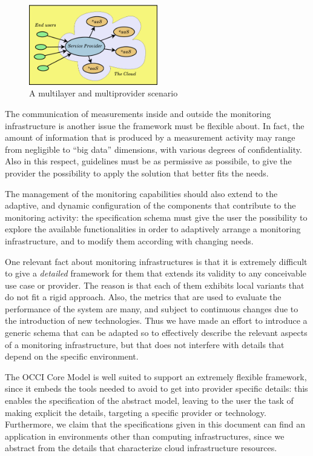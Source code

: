 \documentclass[10pt,a4paper]{article}
\begin{document}
\begin{figure}[b]
\centering
\includegraphics[width=0.5\textwidth]{figs/multilayer.pdf}
\caption{A multilayer and multiprovider scenario \label{img:scenario}}
\end{figure}

The communication of measurements inside and outside the monitoring infrastructure is another issue the framework must be flexible about. In fact, the amount of information that is produced by a measurement activity may range from negligible to ``big data'' dimensions, with various degrees of confidentiality. Also in this respect, guidelines must be as permissive as possibile, to give the provider the possibility to apply the solution that better fits the needs.

The management of the monitoring capabilities should also extend to the adaptive, and dynamic configuration of the components that contribute to the monitoring activity: the specification schema must give the user the possibility to explore the available functionalities in order to adaptively arrange a monitoring infrastructure, and to modify them according with changing needs.

One relevant fact about monitoring infrastructures is that it is extremely difficult to give a {\em detailed} framework for them that extends its validity to any conceivable use case or provider. The reason is that each of them exhibits local variants that do not fit a rigid approach. Also, the metrics that are used to evaluate the performance of the system are many, and subject to continuous changes due to the introduction of new technologies. Thus we have made an effort to introduce a generic schema that can be adapted so to effectively describe the relevant aspects of a monitoring infrastructure, but that does not interfere with details that depend on the specific environment.

The OCCI Core Model \cite{occi:core} is well suited to support an extremely flexible framework, since it embeds the tools needed to avoid to get into provider specific details: this enables the specification of the abstract model, leaving to the user the task of making explicit the details, targeting a specific provider or technology. Furthermore, we claim that the specifications given in this document can find an application in environments other than computing infrastructures, since we abstract from the details that characterize cloud infrastructure resources.
\end{document}
